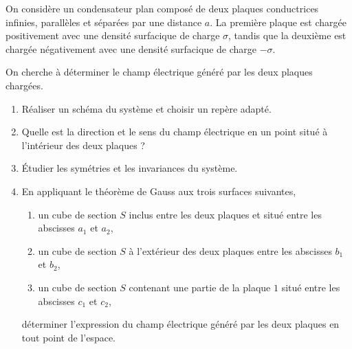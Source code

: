\begin{exocor}
On considère un condensateur plan composé de deux plaques conductrices infinies,
parallèles et séparées par une distance $a$. La
première plaque est chargée positivement avec une densité surfacique de charge
$\sigma$, tandis que la deuxième est chargée négativement avec une densité 
surfacique de charge $-\sigma$.

On cherche à déterminer le champ électrique généré par les deux plaques chargées.

\begin{enumerate}
	\item Réaliser un schéma du système et choisir un repère adapté.
	\item Quelle est la direction et le sens du champ électrique en un point
	  situé à l'intérieur des deux plaques ?
	\item Étudier les symétries et les invariances du système. 
	\item En appliquant le théorème de Gauss aux trois surfaces suivantes,
	  	  	\begin{enumerate}
			\item un cube de section $S$ inclus entre les deux plaques 
			  et situé entre les abscisses $a_1$ et $a_2$,
			\item un cube de section $S$ à l'extérieur des deux plaques
			  entre les abscisses $b_1$ et $b_2$,
			\item un cube de section $S$ contenant une partie 
			  de la plaque $1$ situé entre les abscisses $c_1$ et
			  $c_2$,

		\end{enumerate}
	déterminer l'expression du champ électrique généré par les deux plaques
	en tout point de l'espace.
\end{enumerate}
\end{exocor}
\newpage

